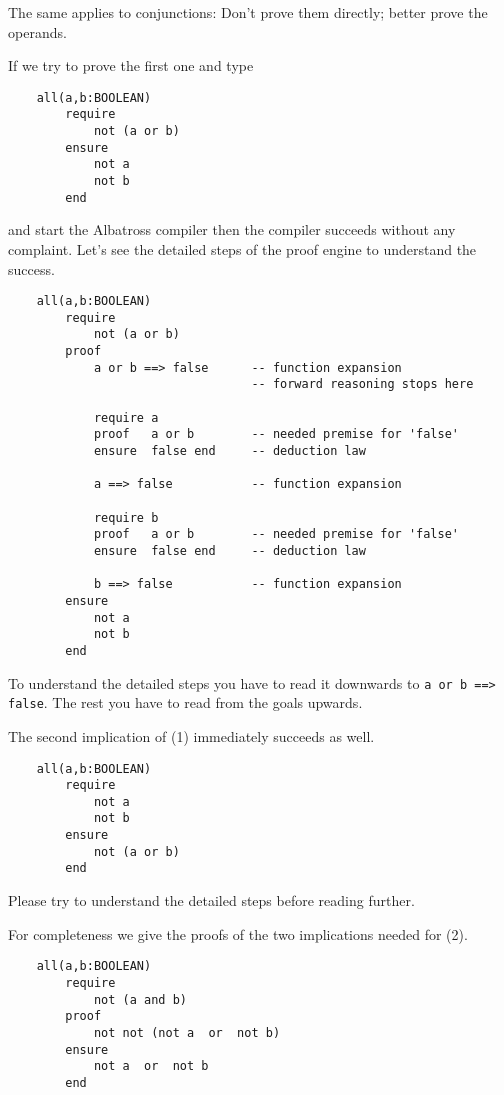 The same applies to conjunctions: Don't prove them directly; better prove the
operands.

If we try to prove the first one and type

\begin{lstlisting}
    all(a,b:BOOLEAN)
        require
            not (a or b)
        ensure
            not a
            not b
        end
\end{lstlisting}
and start the Albatross compiler then the compiler succeeds without any
complaint. Let's see the detailed steps of the proof engine to understand the
success.


\begin{lstlisting}
    all(a,b:BOOLEAN)
        require
            not (a or b)
        proof
            a or b ==> false      -- function expansion
                                  -- forward reasoning stops here

            require a
            proof   a or b        -- needed premise for 'false'
            ensure  false end     -- deduction law

            a ==> false           -- function expansion

            require b
            proof   a or b        -- needed premise for 'false'
            ensure  false end     -- deduction law

            b ==> false           -- function expansion
        ensure
            not a
            not b
        end
\end{lstlisting}
To understand the detailed steps you have to read it downwards to
\lstinline!a or b ==> false!. The rest you have to read from the goals
upwards.

The second implication of (1) immediately succeeds as well.

\begin{lstlisting}
    all(a,b:BOOLEAN)
        require
            not a
            not b
        ensure
            not (a or b)
        end
\end{lstlisting}
Please try to understand the detailed steps before reading further.

For completeness we give the proofs of the two implications needed for (2).

\begin{lstlisting}
    all(a,b:BOOLEAN)
        require
            not (a and b)
        proof
            not not (not a  or  not b)
        ensure
            not a  or  not b
        end
\end{lstlisting}

